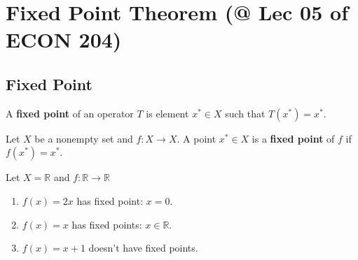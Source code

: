 \documentclass[11pt]{elegantbook}
\begin{document}
\section{Fixed Point Theorem \small{(@ Lec 05 of ECON 204)}}
\subsection{Fixed Point}
\begin{definition}
    \normalfont
    A \textbf{fixed point} of an operator $T$ is element $x^*\in X$ such that $T(x^*)=x^*$.
\end{definition}

\begin{definition}
    \normalfont
    Let $X$ be a nonempty set and $f : X \rightarrow X$. A point $x^* \in X$ is a \textbf{fixed point} of $f$ if $f(x^*) = x^*$.
\end{definition}

\begin{example}
    Let $X=\mathbb{R}$ and $f: \mathbb{R} \rightarrow \mathbb{R}$
    \begin{enumerate}
        \item $f(x)=2x$ has fixed point: $x=0$.
        \item $f(x)=x$ has fixed points: $x\in \mathbb{R}$.
        \item $f(x)=x+1$ doesn't have fixed points.
    \end{enumerate}
\end{example}
\end{document}
